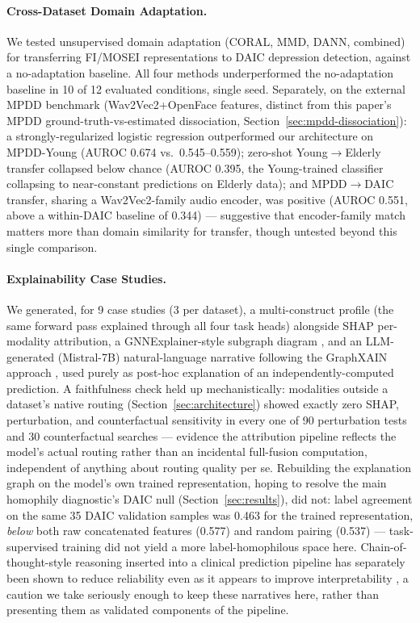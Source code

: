 \documentclass[twocolumn]{article}
\begin{document}
\paragraph{Cross-Dataset Domain Adaptation.} We tested unsupervised domain adaptation (CORAL, MMD, DANN, combined) for transferring FI/MOSEI representations to DAIC depression detection, against a no-adaptation baseline. All four methods underperformed the no-adaptation baseline in 10 of 12 evaluated conditions, single seed. Separately, on the external MPDD benchmark (Wav2Vec2+OpenFace features, distinct from this paper's MPDD ground-truth-vs-estimated dissociation, Section~\ref{sec:mpdd-dissociation}): a strongly-regularized logistic regression outperformed our architecture on MPDD-Young (AUROC 0.674 vs.\ 0.545--0.559); zero-shot Young$\to$Elderly transfer collapsed below chance (AUROC 0.395, the Young-trained classifier collapsing to near-constant predictions on Elderly data); and MPDD$\to$DAIC transfer, sharing a Wav2Vec2-family audio encoder, was positive (AUROC 0.551, above a within-DAIC baseline of 0.344) — suggestive that encoder-family match matters more than domain similarity for transfer, though untested beyond this single comparison.

\paragraph{Explainability Case Studies.} We generated, for 9 case studies (3 per dataset), a multi-construct profile (the same forward pass explained through all four task heads) alongside SHAP per-modality attribution, a GNNExplainer-style subgraph diagram \citep{gnnexplainer2019}, and an LLM-generated (Mistral-7B) natural-language narrative following the GraphXAIN approach \citep{cedro2024graphxain}, used purely as post-hoc explanation of an independently-computed prediction. A faithfulness check held up mechanistically: modalities outside a dataset's native routing (Section~\ref{sec:architecture}) showed exactly zero SHAP, perturbation, and counterfactual sensitivity in every one of 90 perturbation tests and 30 counterfactual searches — evidence the attribution pipeline reflects the model's actual routing rather than an incidental full-fusion computation, independent of anything about routing quality per se. Rebuilding the explanation graph on the model's own trained representation, hoping to resolve the main homophily diagnostic's DAIC null (Section~\ref{sec:results}), did not: label agreement on the same 35 DAIC validation samples was 0.463 for the trained representation, \emph{below} both raw concatenated features (0.577) and random pairing (0.537) — task-supervised training did not yield a more label-homophilous space here. Chain-of-thought-style reasoning inserted into a clinical prediction pipeline has separately been shown to reduce reliability even as it appears to improve interpretability \citep{wu2025cotfails}, a caution we take seriously enough to keep these narratives here, rather than presenting them as validated components of the pipeline.
\end{document}
